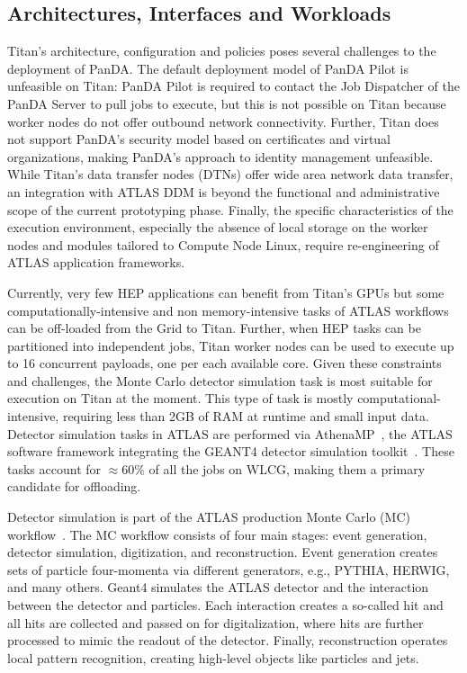 \subsection{Architectures, Interfaces and Workloads}\label{ssec:panda-titan}

Titan's architecture, configuration and policies poses several challenges to
the deployment of PanDA\@. The default deployment model of PanDA Pilot is
unfeasible on Titan: PanDA Pilot is required to contact the Job Dispatcher of
the PanDA Server to pull jobs to execute, but this is not possible on Titan
because worker nodes do not offer outbound network connectivity. Further,
Titan does not support PanDA's security model based on certificates and
virtual organizations, making PanDA's approach to identity management 
unfeasible. While Titan's data transfer nodes (DTNs) offer wide area network
data transfer, an integration with ATLAS DDM is beyond the functional and
administrative scope of the current prototyping phase. Finally, the specific
characteristics of the execution environment, especially the absence of local
storage on the worker nodes and modules tailored to Compute Node Linux,
require re-engineering of ATLAS application frameworks.

Currently, very few HEP applications can benefit from Titan's GPUs but some
computationally-intensive and non memory-intensive tasks of ATLAS workflows
can be off-loaded from the Grid to Titan. Further, when HEP tasks can be
partitioned into independent jobs, Titan worker nodes can be used to execute
up to 16 concurrent payloads, one per each available core. Given these
constraints and challenges, the  Monte Carlo detector simulation task is most
suitable for execution on Titan at the moment. This type of task is mostly
computational-intensive, requiring less than 2GB of RAM at runtime and small
input data. Detector simulation tasks in ATLAS are performed via
AthenaMP~\cite{aad2010atlas}, the ATLAS software framework integrating the
GEANT4 detector simulation toolkit~\cite{agostinelli2003geant4}. These tasks
account for \(\approx\)60\% of all the jobs on WLCG, making them a primary
candidate for offloading.

Detector simulation is part of the ATLAS production Monte Carlo (MC)
workflow~\cite{rimoldi2006atlas}. The MC workflow consists of four main
stages: event generation, detector simulation, digitization, and
reconstruction. Event generation creates sets of particle four-momenta via
different generators, e.g., PYTHIA, HERWIG, and many others. Geant4 simulates
the ATLAS detector and the interaction between the detector and particles.
Each interaction creates a so-called hit and all hits are collected and
passed on for digitalization, where hits are further processed to mimic the
readout of the detector. Finally, reconstruction operates local pattern
recognition, creating high-level objects like particles and jets.

